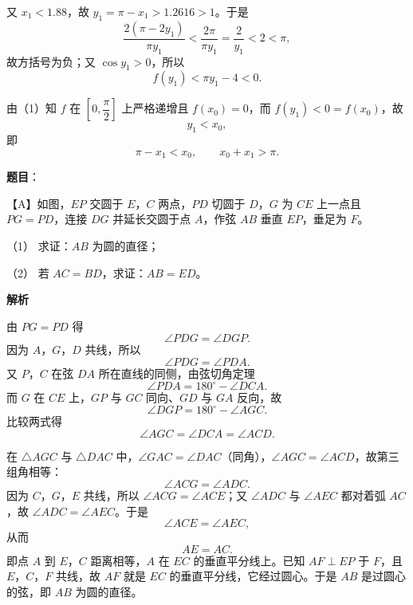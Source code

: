 \begin{answer}
又 $x_1<1.88$，故 $y_1=\pi-x_1>1.2616>1$。于是
\nopagebreak[4]
\[\frac{2(\pi-2y_1)}{\pi y_1}<\frac{2\pi}{\pi y_1}=\frac2{y_1}<2<\pi,\]
故方括号为负；又 $\cos y_1>0$，所以
\nopagebreak[4]
\[f(y_1)<\pi y_1-4<0.\]

由（1）知 $f$ 在 $\left[0,\dfrac\pi2\right]$ 上严格递增且 $f(x_0)=0$，而 $f(y_1)<0=f(x_0)$，故
\nopagebreak[4]
\[y_1<x_0,\]
即
\nopagebreak[4]
\[\pi-x_1<x_0,\qquad x_0+x_1>\pi.\]



\end{answer}
\begin{answer}

\textbf{题目}：

【A】如图，$EP$ 交圆于 $E$，$C$ 两点，$PD$ 切圆于 $D$，$G$ 为 $CE$ 上一点且 $PG=PD$，连接 $DG$ 并延长交圆于点 $A$，作弦 $AB$ 垂直 $EP$，垂足为 $F$。
\nopagebreak[4]
\begin{center}\end{center}
\nopagebreak[4]
（1） 求证：$AB$ 为圆的直径；

（2） 若 $AC=BD$，求证：$AB=ED$。

\textbf{解析}


由 $PG=PD$ 得
\nopagebreak[4]
\[\angle PDG=\angle DGP.\]
因为 $A$，$G$，$D$ 共线，所以
\nopagebreak[4]
\[\angle PDG=\angle PDA.\]
又 $P$，$C$ 在弦 $DA$ 所在直线的同侧，由弦切角定理
\nopagebreak[4]
\[\angle PDA=180^\circ-\angle DCA.\]
而 $G$ 在 $CE$ 上，$GP$ 与 $GC$ 同向、$GD$ 与 $GA$ 反向，故
\nopagebreak[4]
\[\angle DGP=180^\circ-\angle AGC.\]
比较两式得
\nopagebreak[4]
\[\angle AGC=\angle DCA=\angle ACD.\]

在 $\triangle AGC$ 与 $\triangle DAC$ 中，$\angle GAC=\angle DAC$（同角），$\angle AGC=\angle ACD$，故第三组角相等：
\nopagebreak[4]
\[\angle ACG=\angle ADC.\]
因为 $C$，$G$，$E$ 共线，所以 $\angle ACG=\angle ACE$；又 $\angle ADC$ 与 $\angle AEC$ 都对着弧 $AC$，故 $\angle ADC=\angle AEC$。于是
\nopagebreak[4]
\[\angle ACE=\angle AEC,\]
从而
\nopagebreak[4]
\[AE=AC.\]
即点 $A$ 到 $E$，$C$ 距离相等，$A$ 在 $EC$ 的垂直平分线上。已知 $AF\perp EP$ 于 $F$，且 $E$，$C$，$F$ 共线，故 $AF$ 就是 $EC$ 的垂直平分线，它经过圆心。于是 $AB$ 是过圆心的弦，即 $AB$ 为圆的直径。


\end{answer}
